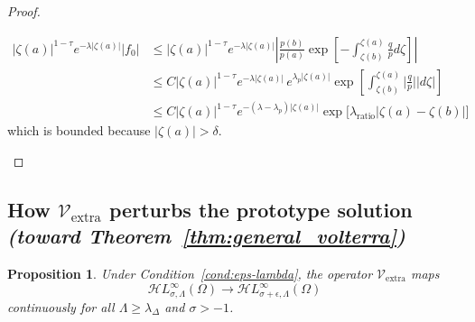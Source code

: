 \documentclass{article}
\theoremstyle{plain}
\newtheorem{prop}{Proposition}
\newcommand{\singexp}[2]{\mathcal{H}L^\infty_{#1, #2}}
\newcommand{\softpart}{\mathcal{V}_\text{extra}}
\begin{document}
\begin{proof}
\begin{itemize}
      \begin{align*}
          |\zeta(a)|^{1-\tau} e^{-\lambda |\zeta(a)|} |f_0|&\leq  |\zeta(a)|^{1-\tau} e^{-\lambda |\zeta(a)|} \left\vert\frac{p(b)}{p(a)}\exp\left[-\int_{\zeta(b)}^{\zeta(a)}\frac{q}{p} d\zeta\right]\right\vert \\
          &\leq C  |\zeta(a)|^{1-\tau} e^{-\lambda |\zeta(a)|}  \, e^{\lambda_p|\zeta(a)|}\exp\left[\int_{\zeta(b)}^{\zeta(a)} \Big\vert\frac{q}{p} \Big\vert |d\zeta| \right]\\
          & \leq C |\zeta(a)|^{1-\tau} e^{-(\lambda-\lambda_p) |\zeta(a)|} \exp\Big[\lambda_\text{ratio} |\zeta(a)-\zeta(b)| \Big]
      \end{align*}
   which is bounded because $|\zeta(a)|>\delta$. 
\end{itemize}

\end{proof}
\color{black}

\subsection{How $\softpart$ perturbs the prototype solution \\ \textit{(toward Theorem~\ref{thm:general_volterra})}}\label{sec:image under soft_part}

\begin{prop}\label{prop:smoothing}
Under {\em Condition~\eqref{cond:eps-lambda}}, the operator $\softpart$ maps
\[ \singexp{\sigma}{\Lambda}(\Omega) \to \singexp{\sigma+\epsilon}{\Lambda}(\Omega) \]
continuously for all $\Lambda\geq \lambda_{\Delta}$ and $\sigma>-1$.
\end{prop}
\end{document}
